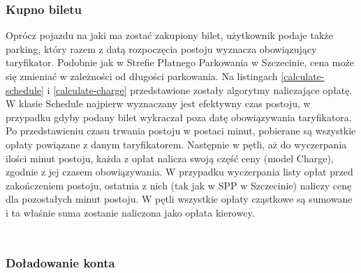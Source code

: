 \begin{singlespace}
	\label{schedule-create}
	\vspace{0.3cm}
	\inputminted[fontsize=\footnotesize, linenos=true]{python}{src/imp/schedule-create.py}
\end{singlespace}


\subsubsection*{Kupno biletu}

Oprócz pojazdu na jaki ma zostać zakupiony bilet, użytkownik podaje także parking, który razem z datą rozpoczęcia postoju wyznacza obowiązujący taryfikator. Podobnie jak w Strefie Płatnego Parkowania w Szczecinie, cena może się zmieniać w zależności od długości parkowania. Na listingach \ref{calculate-schedule} i \ref{calculate-charge} przedstawione zostały algorytmy naliczające opłatę. W klasie Schedule najpierw wyznaczany jest efektywny czas postoju, w przypadku gdyby podany bilet wykraczał poza datę obowiązywania taryfikatora. Po przedstawieniu czasu trwania postoju w postaci minut, pobierane są wszystkie opłaty powiązane z danym taryfikatorem. Następnie w pętli, aż do wyczerpania ilości minut postoju, każda z opłat nalicza swoją część ceny (model Charge), zgodnie z jej czasem obowiązywania. W przypadku wyczerpania listy opłat przed zakończeniem postoju, ostatnia z nich (tak jak w SPP w Szczecinie) naliczy cenę dla pozostałych minut postoju. W pętli wszystkie opłaty cząstkowe są sumowane i ta właśnie suma zostanie naliczona jako opłata kierowcy.

\begin{singlespace}
	\label{calculate-schedule}
	\vspace{0.3cm}
	\inputminted[fontsize=\footnotesize, linenos=true]{python}{src/imp/schedule-calculate_price.py}
\end{singlespace}

\begin{singlespace}
	\label{calculate-charge}
	\vspace{0.3cm}
	\inputminted[fontsize=\footnotesize, linenos=true]{python}{src/imp/charge-calculate_price.py}
\end{singlespace}

\subsubsection*{Doładowanie konta}

